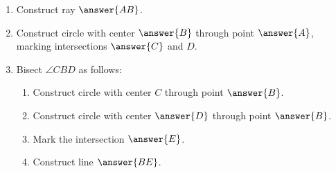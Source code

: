 \documentclass[nooutcomes]{ximera}
\begin{document}
\begin{problem}
\begin{problem}
\begin{enumerate}
\item Construct ray $\answer{AB}$. 
\item Construct circle with center $\answer{B}$ through point $\answer{A}$, marking intersections $\answer{C}$ and $D$. 
\item Bisect $\angle CBD$ as follows: 
\begin{enumerate}
\item Construct circle with center $C$ through point $\answer{B}$. 
\item Construct circle with center $\answer{D}$ through point $\answer{B}$.
\item Mark the intersection $\answer{E}$.
\item Construct line $\answer{BE}$. 
\end{enumerate}
\end{enumerate}


\end{problem}
\end{problem}
\end{document}
